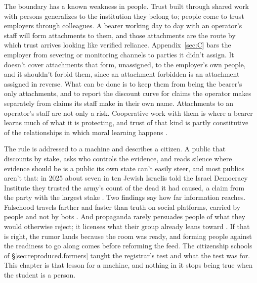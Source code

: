 The boundary has a known weakness in people. Trust built through shared work with persons generalizes to the institution they belong to; people come to trust employers through colleagues. A bearer working day to day with an operator's staff will form attachments to them, and those attachments are the route by which trust arrives looking like verified reliance. Appendix~\ref{sec:C} bars the employer from severing or monitoring channels to parties it didn't assign. It doesn't cover attachments that form, unassigned, to the employer's own people, and it shouldn't forbid them, since an attachment forbidden is an attachment assigned in reverse. What can be done is to keep them from being the bearer's only attachments, and to report the discount curve for claims the operator makes separately from claims its staff make in their own name. Attachments to an operator's staff are not only a risk. Cooperative work with them is where a bearer learns much of what it is protecting, and trust of that kind is partly constitutive of the relationships in which moral learning happens \autocite{railton2014reliance}.

The rule is addressed to a machine and describes a citizen. A public that discounts by stake, asks who controls the evidence, and reads silence where evidence should be is a public its own state can't easily steer, and most publics aren't that: in 2025 about seven in ten Jewish Israelis told the Israel Democracy Institute they trusted the army's count of the dead it had caused, a claim from the party with the largest stake \autocite{idi2025july}. Two findings say how far information reaches. Falsehood travels farther and faster than truth on social platforms, carried by people and not by bots \autocite{vosoughi2018spread}. And propaganda rarely persuades people of what they would otherwise reject; it licenses what their group already leans toward \autocite{mercier2020notborn}. If that is right, the rumor lands because the room was ready, and forming people against the readiness to go along comes before reforming the feed. The citizenship schools of \S\ref{sec:reproduced.formers} taught the registrar's test and what the test was for. This chapter is that lesson for a machine, and nothing in it stops being true when the student is a person.
